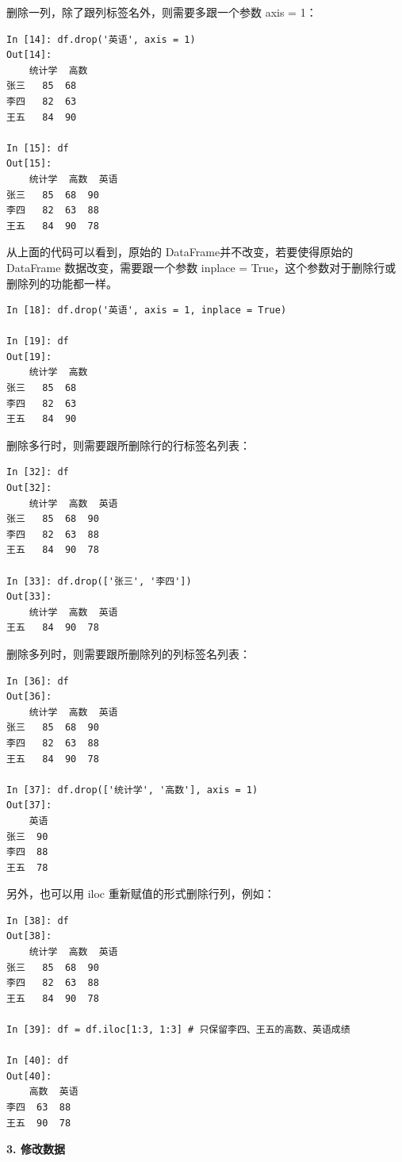删除一列，除了跟列标签名外，则需要多跟一个参数 axis = 1：

\begin{lstlisting}[Language=Python]
In [14]: df.drop('英语', axis = 1)
Out[14]:
    统计学  高数
张三   85  68
李四   82  63
王五   84  90

In [15]: df
Out[15]:
    统计学  高数  英语
张三   85  68  90
李四   82  63  88
王五   84  90  78
\end{lstlisting}

从上面的代码可以看到，原始的 DataFrame并不改变，若要使得原始的 DataFrame 数据改变，需要跟一个参数 inplace = True，这个参数对于删除行或删除列的功能都一样。

\begin{lstlisting}[Language=Python]
In [18]: df.drop('英语', axis = 1, inplace = True)

In [19]: df
Out[19]:
    统计学  高数
张三   85  68
李四   82  63
王五   84  90
\end{lstlisting}

删除多行时，则需要跟所删除行的行标签名列表：
\begin{lstlisting}[Language=Python]
In [32]: df
Out[32]:
    统计学  高数  英语
张三   85  68  90
李四   82  63  88
王五   84  90  78

In [33]: df.drop(['张三', '李四'])
Out[33]:
    统计学  高数  英语
王五   84  90  78
\end{lstlisting}

删除多列时，则需要跟所删除列的列标签名列表：

\begin{lstlisting}[Language=Python]
In [36]: df
Out[36]:
    统计学  高数  英语
张三   85  68  90
李四   82  63  88
王五   84  90  78

In [37]: df.drop(['统计学', '高数'], axis = 1)
Out[37]:
    英语
张三  90
李四  88
王五  78
\end{lstlisting}

另外，也可以用 iloc 重新赋值的形式删除行列，例如：

\begin{lstlisting}[Language=Python]
In [38]: df
Out[38]:
    统计学  高数  英语
张三   85  68  90
李四   82  63  88
王五   84  90  78

In [39]: df = df.iloc[1:3, 1:3] # 只保留李四、王五的高数、英语成绩

In [40]: df
Out[40]:
    高数  英语
李四  63  88
王五  90  78
\end{lstlisting}

\vspace{3pt}
\noindent\textbf{3. 修改数据}
\vspace{3pt}

